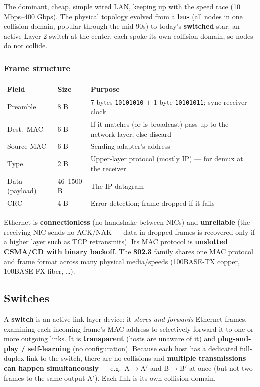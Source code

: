 \documentclass[hidelinks]{article}
\begin{document}
The dominant, cheap, simple wired LAN, keeping up with the speed race
(10 Mbps--400 Gbps). The physical topology evolved from a \textbf{bus} (all
nodes in one collision domain, popular through the mid-90s) to today's
\textbf{switched} star: an active Layer-2 switch at the center, each spoke its
own collision domain, so nodes do not collide.

\subsubsection{Frame structure}
\renewcommand{\arraystretch}{1.3}
\noindent\begin{tabularx}{\textwidth}{|l|l|X|}
\hline
\textbf{Field} & \textbf{Size} & \textbf{Purpose} \\
\hline
Preamble & 8 B & 7 bytes \texttt{10101010} $+$ 1 byte \texttt{10101011}; sync receiver clock \\
\hline
Dest.\ MAC & 6 B & If it matches (or is broadcast) pass up to the network layer, else discard \\
\hline
Source MAC & 6 B & Sending adapter's address \\
\hline
Type & 2 B & Upper-layer protocol (mostly IP) --- for demux at the receiver \\
\hline
Data (payload) & 46--1500 B & The IP datagram \\
\hline
CRC & 4 B & Error detection; frame dropped if it fails \\
\hline
\end{tabularx}

\medskip
\noindent Ethernet is \textbf{connectionless} (no handshake between NICs) and
\textbf{unreliable} (the receiving NIC sends no ACK/NAK --- data in dropped
frames is recovered only if a higher layer such as TCP retransmits). Its MAC
protocol is \textbf{unslotted CSMA/CD with binary backoff}. The \textbf{802.3}
family shares one MAC protocol and frame format across many physical
media/speeds (100BASE-TX copper, 100BASE-FX fiber, \dots).

\subsection{Switches}

A \textbf{switch} is an active link-layer device: it \emph{stores and
forwards} Ethernet frames, examining each incoming frame's MAC address to
selectively forward it to one or more outgoing links. It is \textbf{transparent}
(hosts are unaware of it) and \textbf{plug-and-play / self-learning} (no
configuration). Because each host has a dedicated full-duplex link to the
switch, there are no collisions and \textbf{multiple transmissions can happen
simultaneously} --- e.g.\ A$\to$A$'$ and B$\to$B$'$ at once (but not two frames
to the same output A$'$). Each link is its own collision domain.
\end{document}
